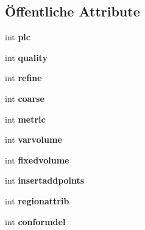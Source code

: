 \subsection*{Öffentliche Attribute}
\begin{DoxyCompactItemize}
\item 
\hypertarget{classtetgenbehavior_a40797ab5b2da5eeb579c6bdfe18b15af}{int {\bfseries plc}}\label{classtetgenbehavior_a40797ab5b2da5eeb579c6bdfe18b15af}

\item 
\hypertarget{classtetgenbehavior_ac071721fb930cc08160743886b412889}{int {\bfseries quality}}\label{classtetgenbehavior_ac071721fb930cc08160743886b412889}

\item 
\hypertarget{classtetgenbehavior_a1db02f7b2524f86a79e5835bece8c6cd}{int {\bfseries refine}}\label{classtetgenbehavior_a1db02f7b2524f86a79e5835bece8c6cd}

\item 
\hypertarget{classtetgenbehavior_a5703d49256e410be54ecf6a4b2f746b6}{int {\bfseries coarse}}\label{classtetgenbehavior_a5703d49256e410be54ecf6a4b2f746b6}

\item 
\hypertarget{classtetgenbehavior_ad3c713eee4e296ce83387b778975a0ee}{int {\bfseries metric}}\label{classtetgenbehavior_ad3c713eee4e296ce83387b778975a0ee}

\item 
\hypertarget{classtetgenbehavior_a59fc93472c81cfe360ddb76c7e008d8e}{int {\bfseries varvolume}}\label{classtetgenbehavior_a59fc93472c81cfe360ddb76c7e008d8e}

\item 
\hypertarget{classtetgenbehavior_a42624c92f7ddb79c01775898ffedec33}{int {\bfseries fixedvolume}}\label{classtetgenbehavior_a42624c92f7ddb79c01775898ffedec33}

\item 
\hypertarget{classtetgenbehavior_a663e7008fca88d61ff34f01716c98da8}{int {\bfseries insertaddpoints}}\label{classtetgenbehavior_a663e7008fca88d61ff34f01716c98da8}

\item 
\hypertarget{classtetgenbehavior_a9784f5c855b4aa50a0327ab1805f14f1}{int {\bfseries regionattrib}}\label{classtetgenbehavior_a9784f5c855b4aa50a0327ab1805f14f1}

\item 
\hypertarget{classtetgenbehavior_a6d2ac52f741d7f78a59e69d504ce9e05}{int {\bfseries conformdel}}\label{classtetgenbehavior_a6d2ac52f741d7f78a59e69d504ce9e05}


\end{DoxyCompactItemize}
